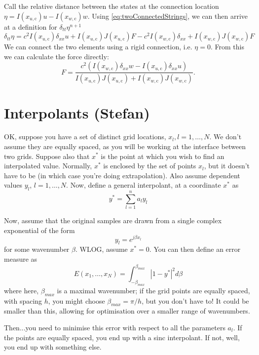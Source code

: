\documentclass[dvipsnames]{article}
\begin{document}
Call the relative distance between the states at the connection location $\eta = I(x_{u,\text{c}})u - I(x_{w,\text{c}})w$. Using \eqref{eq:twoConnectedStrings}, we can then arrive at a definition for $\delta_{tt}\eta^{n+1}$
\begin{equation}
    \delta_{tt}\eta = c^2I(x_{u,\text{c}})\delta_{xx}u +  I(x_{u,\text{c}})J(x_{u,\text{c}})F - c^2 I(x_{w,\text{c}})\delta_{xx} + I(x_{w,\text{c}})J(x_{w,\text{c}})F
\end{equation}
We can connect the two elements using a rigid connection, i.e. $\eta = 0$. From this we can calculate the force directly:
\begin{equation}
    F = \frac{c^2(I(x_{w,\text{c}})\delta_{xx}w-I(x_{u,\text{c}})\delta_{xx}u)}{I(x_{u,\text{c}})J(x_{u,\text{c}}) + I(x_{w,\text{c}})J(x_{w,\text{c}})}.
\end{equation}

\section{Interpolants (Stefan)}

OK, suppose you have a set of distinct grid locations, $x_{l}, l=1,\hdots,N$. We don't assume they are equally spaced, as you will be working at the interface between two grids. Suppose also that $x^{*}$ is the point at which you wish to find an interpolated value. Normally, $x^{*}$ is enclosed by the set of points $x_{l}$, but it doesn't have to be (in which case you're doing extrapolation). Also assume dependent values $y_{l}$, $l=1,\hdots,N$. Now, define a general interpolant, at a coordinate $x^{*}$ as
\begin{equation}
    y^{*} = \sum_{l=1}^{n}a_{l}y_{l}
\end{equation}

Now, assume that the original samples are drawn from a single complex exponential of the form
\begin{equation}
    y_{l} = e^{j\beta x_{l}}
\end{equation}
for some wavenumber $\beta$. WLOG, assume $x^{*} = 0$. You can then define an error measure as
\begin{equation}
    E(x_{1},\hdots,x_{N}) = \int_{-\beta_{max}}^{\beta_{max}}|1-y^{*}|^2 d\beta
\end{equation}
where here, $\beta_{max}$ is a maximal wavenumber; if the grid points are equally spaced, with spacing $h$, you might choose $\beta_{max} = \pi/h$, but you don't have to! It could be smaller than this, allowing for optimisation over a smaller range of wavenumbers. 

Then...you need to minimise this error with respect to all the parameters $a_{l}$. If the points are equally spaced, you end up with a sinc interpolant. If not, well, you end up with something else. 
\end{document}
